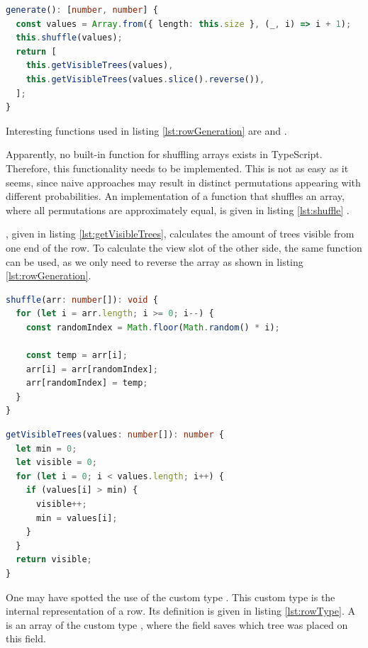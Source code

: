 \begin{lstlisting}[language=TypeScript,caption={Algorithm to generate a row of trees exercise instance of \code{this.size}},label={lst:rowGeneration}]
generate(): [number, number] {
  const values = Array.from({ length: this.size }, (_, i) => i + 1);
  this.shuffle(values);
  return [
    this.getVisibleTrees(values),
    this.getVisibleTrees(values.slice().reverse()),
  ];
}
\end{lstlisting}

Interesting functions used in listing \ref{lst:rowGeneration} are  and . 

Apparently, no built-in function for shuffling arrays exists in TypeScript. Therefore, this functionality needs to be implemented. This is not as easy as it seems, since naive approaches may result in distinct permutations appearing with different probabilities. An implementation of a function that shuffles an array, where all permutations are approximately equal, is given in listing \ref{lst:shuffle} \cite{JavaScriptShuffle}.

, given in listing \ref{lst:getVisibleTrees}, calculates the amount of trees visible from one end of the row. To calculate the view slot of the other side, the same function can be used, as we only need to reverse the array as shown in listing \ref{lst:rowGeneration}.

\begin{lstlisting}[language=TypeScript,caption={Algorithm to shuffle an array},label={lst:shuffle}]
shuffle(arr: number[]): void {
  for (let i = arr.length; i >= 0; i--) {
    const randomIndex = Math.floor(Math.random() * i);

    const temp = arr[i];
    arr[i] = arr[randomIndex];
    arr[randomIndex] = temp;
  }
}
\end{lstlisting}

\begin{lstlisting}[language=TypeScript,caption={Algorithm to calculate the amount of visible tree from one end},label={lst:getVisibleTrees}]
getVisibleTrees(values: number[]): number {
  let min = 0;
  let visible = 0;
  for (let i = 0; i < values.length; i++) {
    if (values[i] > min) {
      visible++;
      min = values[i];
    }
  }
  return visible;
}
\end{lstlisting}

One may have spotted the use of the custom type . This custom type is the internal representation of a row. Its definition is given in listing \ref{lst:rowType}. A  is an array of the custom type , where the field  saves which tree was placed on this field.

